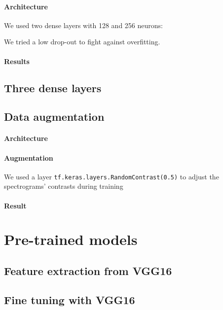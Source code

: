 \paragraph{Architecture}
We used two dense layers with 128 and 256 neurons:



We tried a low drop-out to fight against overfitting.

\paragraph{Results}

\subsection{Three dense layers}

\subsection{Data augmentation}

\paragraph{Architecture}

\paragraph{Augmentation}
We used a layer \texttt{tf.keras.layers.RandomContrast(0.5)} to adjust the spectrograms' contrasts during training

\paragraph{Result}

\section{Pre-trained models}

\subsection{Feature extraction from VGG16}

\subsection{Fine tuning with VGG16}